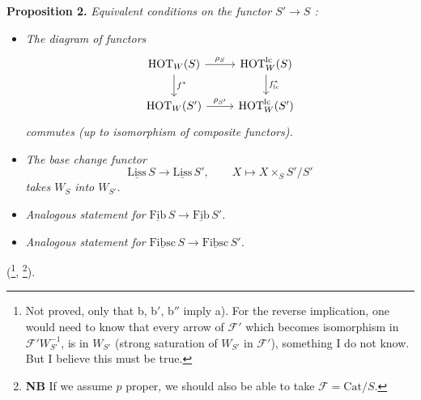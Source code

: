 \documentclass[11pt]{article}
\newcommand{\printedpage}[1]{\marginpar{\footnotesize p.~#1}}
\newcommand{\msp}[1]{\marginpar{\footnotesize [#1]}}
\newcommand{\und}[1]{\underline{\mathrm{#1}}}
\newcommand{\HOT}{\mathrm{HOT}}
\newcommand{\Cat}{\mathrm{Cat}}
\begin{document}
\textbf{Proposition 2.} \textit{Equivalent conditions on the functor $S' \longrightarrow S$ :}

\begin{itemize}
\item[\textit{a)}] \textit{The diagram of functors}
\[
\begin{tikzcd}
\HOT_W(S) \arrow[r, "\rho_S"] \arrow[d, "f^*"] & \HOT_W^{\mathrm{lc}}(S) \arrow[d, "f^*_{\mathrm{lc}}"] \\
\HOT_W(S') \arrow[r, "\rho_{S'}"] & \HOT_W^{\mathrm{lc}}(S')
\end{tikzcd}
\]
\textit{commutes (up to isomorphism of composite functors).}

\msp{page 124}

\item[\textit{b)}] \textit{The base change functor} %
\[
\und{Liss}\,S \longrightarrow \und{Liss}\,S', \qquad X \longmapsto X \times_S S'/S'
\]
\textit{takes $W_S$ into $W_{S'}$.}
\printedpage{77}
\item[\textit{b$'$)}] \textit{Analogous statement for} $\und{Fib}\,S \longrightarrow \und{Fib}\,S'$\textit{.}
\item[\textit{b$''$)}] \textit{Analogous statement for} $\und{Fibsc}\,S \longrightarrow \und{Fibsc}\,S'$\textit{.}
\end{itemize}

(\footnote[63]{Not proved, only that b, b$'$, b$''$ imply a). For the reverse implication, one would need to know that every arrow of $\mathcal{F}'$ which becomes isomorphism in $\mathcal{F}'W_{S'}^{-1}$, is in $W_{S'}$ (strong saturation of $W_{S'}$ in $\mathcal{F}'$), something I do not know. But I believe this must be true.}, \footnote[64]{\textbf{NB} If we assume $p$ proper, we should also be able to take $\mathcal{F} = \Cat/S$.}).
\end{document}
